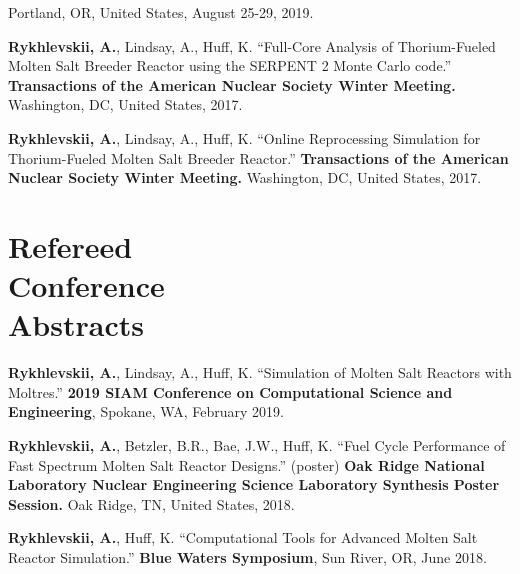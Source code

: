 \documentclass[margin,line]{resume}
\begin{document}
\begin{resume}
\begin{bibenum}
            Portland, OR, United States, August 25-29, 2019.    
    \item \textbf{Rykhlevskii, A.}, Lindsay, A., Huff, K. ``Full-Core Analysis of Thorium-Fueled Molten Salt Breeder Reactor using the SERPENT 2 Monte Carlo code.'' 
            \textbf{Transactions of the American Nuclear Society Winter Meeting.} 
            Washington, DC, United States, 2017.
    \item \textbf{Rykhlevskii, A.}, Lindsay, A., Huff, K. ``Online Reprocessing Simulation for Thorium-Fueled Molten Salt Breeder Reactor.'' 
            \textbf{Transactions of the American Nuclear Society Winter Meeting.} 
            Washington, DC, United States, 2017.
	\end{bibenum}
    \section{\mysidestyle Refereed\\Conference\\Abstracts}
    \begin{bibenum} 
    \item \textbf{Rykhlevskii, A.}, Lindsay, A., Huff, K. ``Simulation of Molten Salt Reactors with Moltres.'' \textbf{2019 SIAM Conference on Computational Science and Engineering}, 
            Spokane, WA, February 2019.
	\item \textbf{Rykhlevskii, A.}, Betzler, B.R., Bae, J.W., Huff, K. ``Fuel Cycle Performance of Fast Spectrum Molten Salt Reactor Designs.'' (poster)
            \textbf{Oak Ridge National Laboratory Nuclear Engineering Science Laboratory Synthesis Poster Session.} 
            Oak Ridge, TN, United States, 2018.
    \item \textbf{Rykhlevskii, A.}, Huff, K. ``Computational Tools for Advanced 
            Molten Salt Reactor Simulation.'' \textbf{Blue Waters Symposium}, 
            Sun River, OR, June 2018.
	\end{bibenum}

\end{resume}
\end{document}
